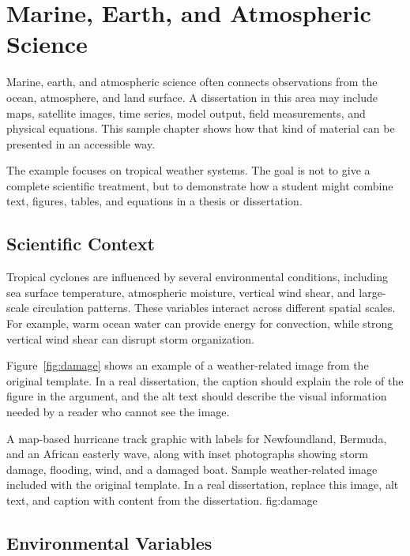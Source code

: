 \chapter{Marine, Earth, and Atmospheric Science}
\label{chap-four}

Marine, earth, and atmospheric science often connects observations from the ocean, atmosphere, and land surface. A dissertation in this area may include maps, satellite images, time series, model output, field measurements, and physical equations. This sample chapter shows how that kind of material can be presented in an accessible way.

The example focuses on tropical weather systems. The goal is not to give a complete scientific treatment, but to demonstrate how a student might combine text, figures, tables, and equations in a thesis or dissertation.

\section{Scientific Context}
\label{sec:meas-context}

Tropical cyclones are influenced by several environmental conditions, including sea surface temperature, atmospheric moisture, vertical wind shear, and large-scale circulation patterns. These variables interact across different spatial scales. For example, warm ocean water can provide energy for convection, while strong vertical wind shear can disrupt storm organization.

Figure~\ref{fig:damage} shows an example of a weather-related image from the original template. In a real dissertation, the caption should explain the role of the figure in the argument, and the alt text should describe the visual information needed by a reader who cannot see the image.

  {A map-based hurricane track graphic with labels for Newfoundland, Bermuda, and an African easterly wave, along with inset photographs showing storm damage, flooding, wind, and a damaged boat.}
  {Sample weather-related image included with the original template. In a real dissertation, replace this image, alt text, and caption with content from the dissertation.}
  {fig:damage}

\section{Environmental Variables}
\label{sec:meas-variables}

